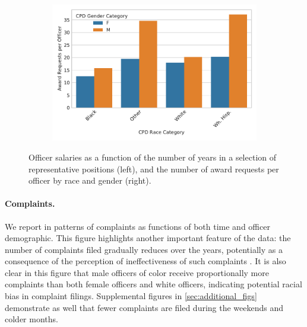 \begin{figure}[t!] 
\begin{subfigure}{0.43\textwidth}
\end{subfigure}
\begin{subfigure}{0.53\textwidth}
\includegraphics[width=\textwidth]{figs/awards} 
\end{subfigure}
\caption{Officer salaries as a function of the number of years in a selection of representative positions (left),
and the number of award requests per officer by race and gender (right).} \label{fig:salary_awards}
\end{figure}


\paragraph{Complaints.} 
We report in  patterns of complaints as functions of both time
and officer demographic. This figure highlights another important feature of the data: 
the number of complaints filed gradually reduces over the years, potentially as a 
consequence of the perception of ineffectiveness of such complaints \cite{xx}.
It is also clear in this figure that male officers of color receive proportionally more complaints
than both female officers and white officers, indicating potential racial bias in complaint filings.
Supplemental figures in \cref{sec:additional_figs} demonstrate as well that fewer complaints are 
filed during the weekends and colder months.

